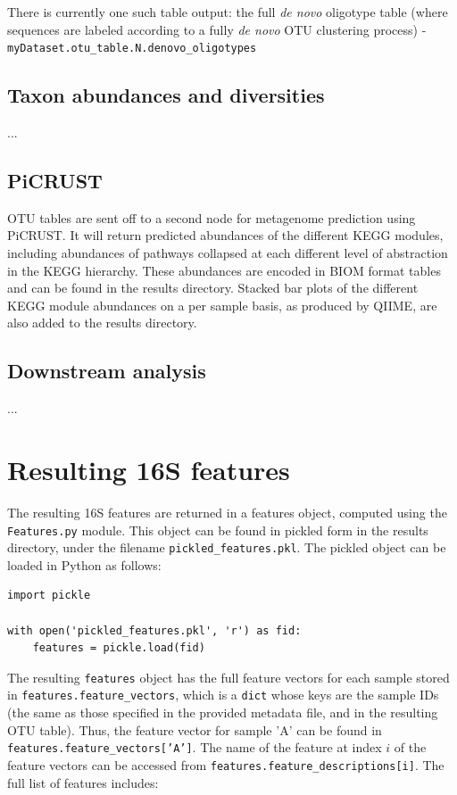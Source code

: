 \documentclass[11pt, oneside]{article}   	%
\begin{document}
There is currently one such table output: the full \textit{de novo} oligotype table (where sequences are labeled according to a fully \textit{de novo} OTU clustering process) - \\{\tt myDataset.otu\_table.N.denovo\_oligotypes}

\subsection{Taxon abundances and diversities}
...

\subsection{PiCRUST}
OTU tables are sent off to a second node for metagenome prediction using PiCRUST.  It will return predicted abundances of the different KEGG modules, including abundances of pathways collapsed at each different level of abstraction in the KEGG hierarchy.  These abundances are encoded in BIOM format tables and can be found in the results directory.  Stacked bar plots of the different KEGG module abundances on a per sample basis, as produced by QIIME, are also added to the results directory. 

\subsection{Downstream analysis}
...

\section{Resulting 16S features}
The resulting 16S features are returned in a features object, computed using the {\tt Features.py} module.  This object can be found in pickled form in the results directory, under the filename {\tt pickled\_features.pkl}.  The pickled object can be loaded in Python as follows:
\begin{verbatim}
import pickle

with open('pickled_features.pkl', 'r') as fid:
    features = pickle.load(fid)
\end{verbatim}
The resulting {\tt features} object has the full feature vectors for each sample stored in {\tt features.feature\_vectors}, which is a {\tt dict} whose keys are the sample IDs (the same as those specified in the provided metadata file, and in the resulting OTU table).  Thus, the feature vector for sample 'A' can be found in {\tt features.feature\_vectors['A']}.  The name of the feature at index $i$ of the feature vectors can be accessed from {\tt features.feature\_descriptions[i]}.  The full list of features includes:
\end{document}

